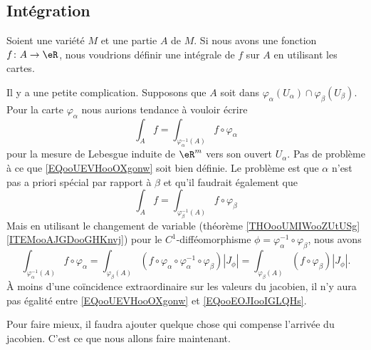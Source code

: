 \subsection{Intégration}

Soient une variété \( M\) et une partie \( A\) de \( M\). Si nous avons une fonction \( f\colon A\to \eR\), nous voudrions définir une intégrale de \( f\) sur \( A\) en utilisant les cartes.

Il y a une petite complication. Supposons que \( A\) soit dans \( \varphi_{\alpha}(U_{\alpha})\cap \varphi_{\beta}(U_{\beta})\). Pour la carte \( \varphi_{\alpha}\) nous aurions tendance à vouloir écrire
\begin{equation}        \label{EQooUEVHooOXgonw}
    \int_A f=\int_{\varphi_{\alpha}^{-1}(A)}f\circ \varphi_{\alpha}
\end{equation}
pour la mesure de Lebesgue induite de \( \eR^m\) vers son ouvert \( U_{\alpha}\). Pas de problème à ce que \eqref{EQooUEVHooOXgonw} soit bien définie. Le problème est que \( \alpha\) n'est pas a priori spécial par rapport à \( \beta\) et qu'il faudrait également que
\begin{equation}        \label{EQooEOJIooIGLQHs}
    \int_A f=\int_{\varphi_{\beta}^{-1}(A)}f\circ \varphi_{\beta}
\end{equation}
Mais en utilisant le changement de variable (théorème \ref{THOooUMIWooZUtUSg}\ref{ITEMooAJGDooGHKnvj}) pour le \( C^1\)-difféomorphisme \( \phi=\varphi_{\alpha}^{-1}\circ \varphi_{\beta}\), nous avons
\begin{equation}
    \int_{\varphi_{\alpha}^{-1}(A)}f\circ \varphi_{\alpha}=\int_{\varphi_{\beta}(A)}(f\circ \varphi_{\alpha}\circ\varphi_{\alpha}^{-1}\circ\varphi_{\beta})| J_{\phi} |=\int_{\varphi_{\beta}(A)}(f\circ \varphi_{\beta})| J_{\phi} |.
\end{equation}
À moins d'une coïncidence extraordinaire sur les valeurs du jacobien, il n'y aura pas égalité entre \eqref{EQooUEVHooOXgonw} et \eqref{EQooEOJIooIGLQHs}.

Pour faire mieux, il faudra ajouter quelque chose qui compense l'arrivée du jacobien. C'est ce que nous allons faire maintenant.

